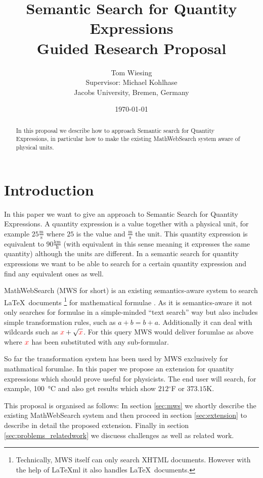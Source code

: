 \documentclass[11pt]{article}
\title{Semantic Search for Quantity Expressions\\ \vspace{2 mm} Guided Research Proposal}
\author{Tom Wiesing\\Supervisor: Michael Kohlhase\\Jacobs University, Bremen, Germany}
\date{\today}
\begin{document}
\maketitle

\begin{abstract}
  In this proposal we describe how to approach Semantic search for Quantity Expressions, in particular how to make the existing MathWebSearch system aware of physical units.
\end{abstract}

\section{Introduction}

In this paper we want to give an approach to Semantic Search for Quantity Expressions. A quantity expression is a value together with a physical unit, for example $25 \frac{\text{m}}{\text{s}}$ where $25$ is the value and $\frac{\text{m}}{\text{s}}$ the unit. This quantity expression is equivalent to $90 \frac{\text{km}}{\text{h}}$ (with equivalent in this sense meaning it expresses the same quantity) although the units are different. In a semantic search for quantity expressions we want to be able to search for a certain quantity expression and find any equivalent ones as well.

MathWebSearch (MWS for short) is an existing semantics-aware system to search \LaTeX \  documents \footnote{Technically, MWS itself can only search XHTML documents. However with the help of \LaTeX{}ml \cite{Miller:latexml:base} it also handles \LaTeX \  documents. } for mathematical formulae \cite{HamKohPro:man14}. As it is semantics-aware it not only searches for formulae in a simple-minded ``text search'' way but also includes simple transformation rules, such as $a + b = b + a$. Additionally it can deal with wildcards such as $ { \color{red} x} + \sqrt{\color{red} x}$. For this query MWS would deliver forumlae as above where $ { \color{red} x} $ has been substituted with any sub-formular.

So far the transformation system has been used by MWS exclusively for mathmatical forumlae. In this paper we propose an extension for quantity expressions which should prove useful for physicists.
The end user will search, for example, \SI{100}{\degreeCelsius} and also get results which show $212$$^\circ$F or $373.15$K.

This proposal is organised as follows: In section \ref{sec:mws} we shortly describe the existing MathWebSearch system and then proceed in section \ref{sec:extension} to describe in detail the proposed extension. Finally in section \ref{sec:problems_relatedwork} we discuess challenges as well as related work.
\end{document}
